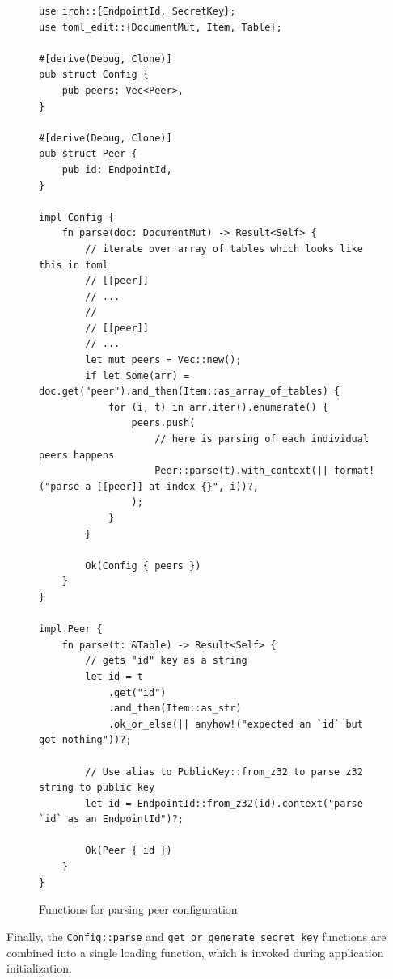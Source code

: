 \documentclass[a4paper, 10pt]{article}
\begin{document}
\begin{figure}[H]
  \begin{verbatim}
use iroh::{EndpointId, SecretKey};
use toml_edit::{DocumentMut, Item, Table};

#[derive(Debug, Clone)]
pub struct Config {
    pub peers: Vec<Peer>,
}

#[derive(Debug, Clone)]
pub struct Peer {
    pub id: EndpointId,
}

impl Config {
    fn parse(doc: DocumentMut) -> Result<Self> {
        // iterate over array of tables which looks like this in toml
        // [[peer]]
        // ...
        //
        // [[peer]]
        // ...
        let mut peers = Vec::new();
        if let Some(arr) = doc.get("peer").and_then(Item::as_array_of_tables) {
            for (i, t) in arr.iter().enumerate() {
                peers.push(
                    // here is parsing of each individual peers happens
                    Peer::parse(t).with_context(|| format!("parse a [[peer]] at index {}", i))?,
                );
            }
        }

        Ok(Config { peers })
    }
}

impl Peer {
    fn parse(t: &Table) -> Result<Self> {
        // gets "id" key as a string
        let id = t
            .get("id")
            .and_then(Item::as_str)
            .ok_or_else(|| anyhow!("expected an `id` but got nothing"))?;

        // Use alias to PublicKey::from_z32 to parse z32 string to public key
        let id = EndpointId::from_z32(id).context("parse `id` as an EndpointId")?;

        Ok(Peer { id })
    }
}

  \end{verbatim}
  \caption{Functions for parsing peer configuration}
\end{figure}

\newpage

Finally, the \texttt{Config::parse} and \texttt{get\_or\_generate\_secret\_key} functions are combined into a single loading function,
which is invoked during application initialization.
\end{document}
